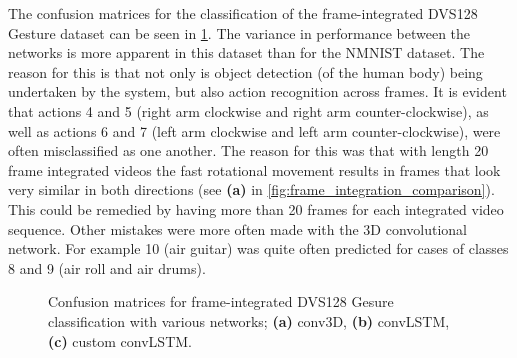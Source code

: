 \vspace{10pt}

The confusion matrices for the classification of the frame-integrated DVS128 Gesture dataset can be seen in \cref{fig:dvs128_c_matrices}. The variance in performance between the networks is more apparent in this dataset than for the NMNIST dataset. The reason for this is that not only is object detection (of the human body) being undertaken by the system, but also action recognition across frames. It is evident that actions 4 and 5 (right arm clockwise and right arm counter-clockwise), as well as actions 6 and 7 (left arm clockwise and left arm counter-clockwise), were often misclassified as one another. The reason for this was that with length 20 frame integrated videos the fast rotational movement results in frames that look very similar in both directions (see \textbf{(a)} in \cref{fig:frame_integration_comparison}). This could be remedied by having more than 20 frames for each integrated video sequence. Other mistakes were more often made with the 3D convolutional network. For example 10 (air guitar) was quite often predicted for cases of classes 8 and 9 (air roll and air drums). 

\begin{figure}[htb]%
    \centering
    \qquad
    \qquad
    \caption{Confusion matrices for frame-integrated  DVS128 Gesure classification with various networks; \textbf{(a)} conv3D, \textbf{(b)} convLSTM, \textbf{(c)} custom convLSTM.}%
    \label{fig:dvs128_c_matrices}%
\end{figure}

